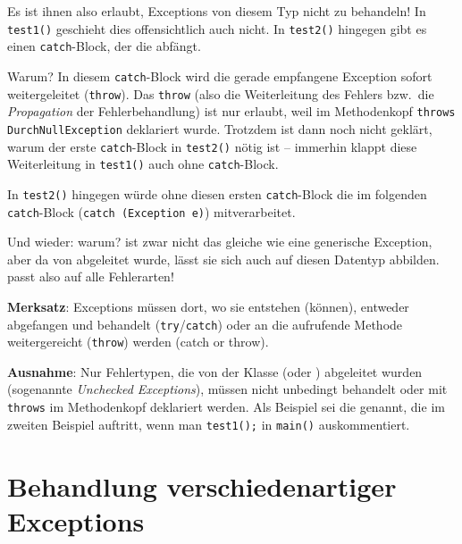 Es ist ihnen also erlaubt, Exceptions von diesem Typ nicht zu behandeln! In
\lstinline|test1()| geschieht dies offensichtlich auch nicht. In
\lstinline|test2()| hingegen gibt es einen \lstinline|catch|-Block, der die
 abfängt.

Warum? In diesem \lstinline|catch|-Block wird die gerade empfangene Exception
sofort weitergeleitet (\lstinline|throw|). Das \lstinline|throw| (also die
Weiterleitung des Fehlers bzw.\ die \emph{Propagation} der Fehlerbehandlung)
ist nur erlaubt, weil im Methodenkopf \lstinline|throws DurchNullException|
deklariert wurde. Trotzdem ist dann noch nicht geklärt, warum der erste
\lstinline|catch|-Block in \lstinline|test2()| nötig ist -- immerhin klappt
diese Weiterleitung in \lstinline|test1()| auch ohne \lstinline|catch|-Block.

In \lstinline|test2()| hingegen würde ohne diesen ersten
\lstinline|catch|-Block die  im folgenden
\lstinline|catch|-Block (\lstinline|catch (Exception e)|) mitverarbeitet.

Und wieder: warum?  ist zwar nicht das gleiche wie
eine generische Exception, aber da  von
 abgeleitet wurde, lässt sie sich auch auf diesen Datentyp
abbilden.  passt also auf alle Fehlerarten!

\textbf{Merksatz}: Exceptions müssen dort, wo sie entstehen (können), entweder
abgefangen und behandelt (\lstinline|try|/\lstinline|catch|) oder an die
aufrufende Methode weitergereicht (\lstinline|throw|) werden (\glqq catch or
throw\grqq ).

\textbf{Ausnahme}: Nur Fehlertypen, die von der Klasse
 (oder ) abgeleitet wurden
(sogenannte \emph{Unchecked Exceptions}), müssen nicht unbedingt behandelt
oder mit \lstinline|throws| im Methodenkopf deklariert werden. Als Beispiel sei
die  genannt, die im zweiten Beispiel auftritt,
wenn man \lstinline|test1();| in \lstinline|main()| auskommentiert.


\section{Behandlung verschiedenartiger Exceptions}



